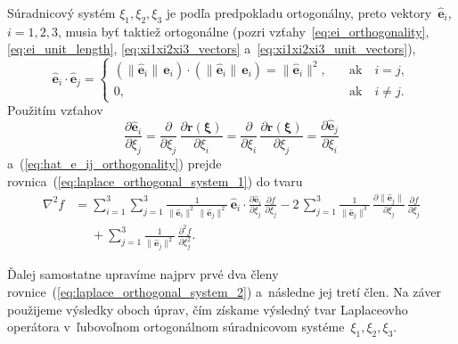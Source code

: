 \documentclass[a4paper, 12pt]{book}
\let\vec\mathbf
\begin{document}
Súradnicový systém $\xi_1, \xi_2, \xi_3$ je podľa predpokladu ortogonálny, 
preto vektory~$\hat{\vec e}_i$, $i = 1, 2, 3$, musia byť taktiež ortogonálne 
(pozri vzťahy~\ref{eq:ei_orthogonality}, \ref{eq:ei_unit_length}, 
\ref{eq:xi1xi2xi3_vectors} a~\ref{eq:xi1xi2xi3_unit_vectors}),
%
\begin{equation}
\label{eq:hat_e_ij_orthogonality}
\hat{\vec e}_i \cdot \hat{\vec e}_j =
%
\begin{cases}
\left( \| \hat{\vec e}_i \| \, \vec e_i \right) \cdot \left( \| \hat{\vec e}_i 
\| \, \vec e_i \right) = \| \hat{\vec e}_i \|^2{,} \quad &\textrm{ak} \quad 
i = j{,}\\
0{,} \quad &\textrm{ak} \quad i \neq j{.}
\end{cases}
\end{equation}
%
Použitím vzťahov
%
\begin{equation}
\label{eq:partials_hat_e}
\frac{\partial \hat{\vec e}_i}{\partial \xi_j} = \frac{\partial}{\partial 
\xi_j} \, \frac{\partial \vec r(\boldsymbol \xi)}{\partial \xi_i} 
= \frac{\partial}{\partial \xi_i} \, \frac{\partial \vec r(\boldsymbol 
\xi)}{\partial \xi_j} = \frac{\partial \hat{\vec e}_j}{\partial \xi_i}
\end{equation}
%
a~(\ref{eq:hat_e_ij_orthogonality}) prejde 
rovnica~(\ref{eq:laplace_orthogonal_system_1}) do tvaru
%
\begin{equation}
\label{eq:laplace_orthogonal_system_2}
\begin{split}
\nabla^2 f &= \sum_{i = 1}^{3} \sum_{j = 1}^3 \frac{1}{\| \hat{\vec e}_i \|^2 
\, \| \hat{\vec e}_j \|^2} \, \hat{\vec e}_i \cdot \frac{\partial \hat{\vec 
e}_i}{\partial \xi_j} \, \frac{\partial f}{\partial \xi_j}
- 2\, \sum_{j = 1}^{3} \frac{1}{\|\hat{\vec e}_j \|^3} \, \frac{\partial \| 
\hat{\vec e}_j \|}{\partial \xi_j} \, \frac{\partial f}{\partial \xi_j}\\
%
&\phantom{={}}+ \sum_{j = 1}^3 \frac{1}{\| \hat{\vec e}_j \|^2} \, 
\frac{\partial^2 f}{\partial \xi_j^2}{.}
\end{split}
%
\end{equation}

Ďalej samostatne upravíme najprv prvé dva členy 
rovnice~(\ref{eq:laplace_orthogonal_system_2}) a~následne jej tretí člen.  Na 
záver použijeme výsledky oboch úprav, čím získame výsledný tvar Laplaceovho 
operátora v~ľubovoľnom ortogonálnom súradnicovom systéme~$\xi_1, \xi_2, \xi_3$.
\end{document}
